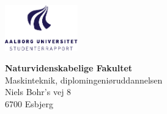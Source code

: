 
\thispagestyle{empty}

\begin{minipage}[t]{0.48\textwidth}
\vspace*{-25pt}			%
\includegraphics[height=2cm]{billeder/formalia/aau_logo_da.pdf}
\end{minipage}
\hfill
\begin{minipage}[t]{0.48\textwidth}
{\small 
\textbf{Naturvidenskabelige Fakultet}\\	
Maskinteknik, diplomingeniøruddannelsen\\
Niels Bohr's vej 8\\
6700 Esbjerg}
\end{minipage}
\vspace*{1cm}

